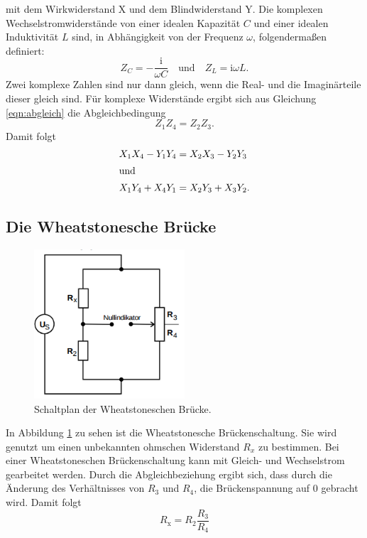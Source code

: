 \documentclass[
  bibliography=totoc,     %
  captions=tableheading,  %
  titlepage=firstiscover, %
]{scrartcl}
\begin{document}
mit dem Wirkwiderstand X und dem Blindwiderstand Y. Die komplexen
Wechselstromwiderstände von einer idealen Kapazität $C$ und einer idealen
Induktivität $L$ sind, in Abhängigkeit von der Frequenz $\omega$, folgendermaßen
definiert:
\begin{equation}
    Z_C = -\frac{\mathup{i}}{\omega C} \quad \mathup{und} \quad Z_L = \mathup{i} \omega L.
    \label{eqn:impedanzen}
\end{equation}
Zwei komplexe Zahlen sind nur dann gleich, wenn die Real- und die Imaginärteile
dieser gleich sind. Für komplexe Widerstände ergibt sich aus Gleichung
\eqref{eqn:abgleich} die Abgleichbedingung
\begin{equation}
    \label{eqn:abgleich_komplex}
    Z_1 Z_4 = Z_2 Z_3.
\end{equation}
Damit folgt
\begin{align}
    \label{eqn:abgleich_komplex_1}
    X_1 X_4 - Y_1 Y_4 &= X_2 X_3 - Y_2 Y_3 \\
    \shortintertext{und}
    \label{eqn:abgleich_komplex_2}
    X_1 Y_4 + X_4 Y_1 &= X_2 Y_3 + X_3 Y_2.
\end{align}
\newpage
\subsection{Die Wheatstonesche Brücke}
\begin{figure}[htb]
  \centering
  \includegraphics[width=0.5\textwidth]{V3022.png}
  \caption{Schaltplan der Wheatstoneschen Brücke. \cite{anleitung}}
  \label{fig:V3022}
\end{figure}
In Abbildung \ref{fig:V3022} zu sehen ist die Wheatstonesche Brückenschaltung.
Sie wird genutzt um einen unbekannten ohmschen Widerstand $R_x$ zu bestimmen.
Bei einer Wheatstoneschen Brückenschaltung kann mit Gleich- und
Wechselstrom gearbeitet werden. Durch die Abgleichbeziehung ergibt sich,
dass durch die Änderung des Verhältnisses von $R_3$ und $R_4$, die
Brückenspannung auf 0 gebracht wird. Damit folgt
\begin{equation}
    \label{eqn:wheatstone}
    R_{\mathup{x}} = R_2 \frac{R_3}{R_4}
\end{equation}
\newpage
\end{document}
